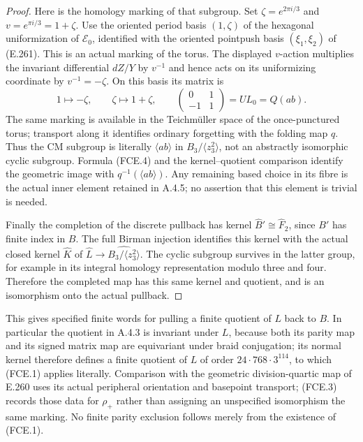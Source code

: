 \begin{proof}
Here is the homology marking of that subgroup.  Set
$\zeta=e^{2\pi i/3}$ and $v=e^{\pi i/3}=1+\zeta$.
Use the oriented period basis $(1,\zeta)$ of the hexagonal
uniformization of $\mathcal E_0$, identified with the oriented
pointpush basis $(\xi_1,\xi_2)$ of (E.261).  This is an actual
marking of the torus.  The displayed $v$-action multiplies the
invariant differential $dZ/Y$ by $v^{-1}$ and hence acts on its
uniformizing coordinate by $v^{-1}=-\zeta$.  On this basis its
matrix is
\[
 1\longmapsto-\zeta,\qquad
 \zeta\longmapsto1+\zeta,\qquad
 \begin{pmatrix}0&1\\-1&1\end{pmatrix}
 =UL_0=Q(ab).                                           \tag{FCE.6}
\]
The same marking is available in the Teichm\"uller space of the
once-punctured torus; transport along it identifies ordinary
forgetting with the folding map $q$.  Thus the CM subgroup is
literally $\langle ab\rangle$ in
$B_3/\langle z_3^2\rangle$, not an abstractly isomorphic cyclic
subgroup.  Formula (FCE.4) and the kernel--quotient comparison
identify the geometric image with $q^{-1}(\langle ab\rangle)$.
Any remaining based choice in its fibre is the actual inner
element retained in A.4.5; no assertion that this element is
trivial is needed.

Finally the completion of the discrete pullback has kernel
$\widehat B'\cong\widehat F_2$, since $B'$ has finite index in $B$.
The full Birman injection identifies this kernel with the actual
closed kernel $\widehat K$ of $\widehat L\to\widehat{B_3/\langle
z_3^2\rangle}$.  The cyclic subgroup survives in the latter group,
for example in its integral homology representation modulo three
and four.  Therefore the completed map has this same kernel and
quotient, and is an isomorphism onto the actual pullback.
\end{proof}

This gives specified finite words for pulling a finite quotient of
$L$ back to $B$.  In particular the quotient in A.4.3 is invariant
under $L$, because both its parity map and its signed matrix map
are equivariant under braid conjugation; its normal kernel therefore
defines a finite quotient of $L$ of order
$24\cdot768\cdot3^{114}$, to which (FCE.1) applies literally.
Comparison with the geometric division-quartic map of E.260 uses
its actual peripheral orientation and basepoint transport; (FCE.3)
records those data for $\rho_+$ rather than assigning an unspecified
isomorphism the same marking.  No finite parity exclusion follows
merely from the existence of (FCE.1).
